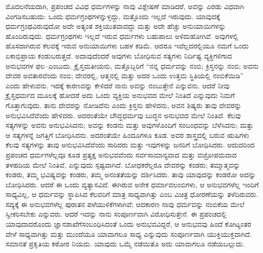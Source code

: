 ಮೊದಲನೆಯದಾಗಿ, ಪ್ರಪಂಚದ ವಿವಿಧ ಧರ್ಮಗಳನ್ನು ನಾವು ವಿಶ್ಲೇಷಣೆ ಮಾಡಿದರೆ, ಅವನ್ನು ಎರಡು ವಿಧವಾಗಿ ವಿಂಗಡಿಸಬಹುದು: ಒಂದು ಧರ್ಮಗ್ರಂಥಗಳನ್ನುಳ್ಳದ್ದು, ಮತ್ತೊಂದು ಇಲ್ಲದೆ ಇರುವುದು. ಯಾವುದಕ್ಕೆ ಧರ್ಮಗ್ರಂಥವಿರುವುದೋ ಅದೇ ಅತ್ಯಂತ ಶಕ್ತಿಯುತವಾದದ್ದು ಮತ್ತು ಅದೇ ಹೆಚ್ಚು ಅನುಯಾಯಿಗಳನ್ನು ಹೊಂದಿರುವುದು. ಧರ್ಮಗ್ರಂಥಗಳು ಇಲ್ಲದೆ ಇರುವ ಧರ್ಮಗಳು ಬಹುಪಾಲು ಅಳಿದುಹೋಗಿವೆ. ಅವುಗಳಲ್ಲಿ ಹೊಸದಾಗಿರುವ ಕೆಲವಕ್ಕೆ ಇರುವ ಅನುಯಾಯಿಗಳು ಬಹಳ ಕಡಿಮೆ. ಆದರೂ ಇವೆಲ್ಲದರಲ್ಲಿಯೂ ನಮಗೆ ಒಂದು ಏಕಾಭಿಪ್ರಾಯ ಕಂಡುಬರುತ್ತದೆ. ಅದಾವುದೆಂದರೆ ಅವುಗಳು ಬೋಧಿಸುವ ಸತ್ಯಗಳು ನಿರ್ದಿಷ್ಟ ವ್ಯಕ್ತಿಗಳಿಗಾದ ಅನುಭವಗಳ ಫಲ–ಎಂಬುದು. ಕ್ರೈಸ್ತಮತೀಯನು, ಮತ್ತೊಬ್ಬರಿಗೆ “ನನ್ನ ಧರ್ಮವನ್ನು ನಂಬಿ; ಕ್ರಿಸ್ತನನ್ನು ನಂಬಿ; ಅವನು ದೇವರ ಅವತಾರವೆಂದು ನಂಬಿ; ದೇವರಲ್ಲಿ, ಆತ್ಮನಲ್ಲಿ ಮತ್ತು ಅದರ ಒಂದು ಉತ್ತಮ ಸ್ಥಿತಿಯಲ್ಲಿ ನಂಬಿಕೆಯಿಡಿ” ಎಂದು ಹೇಳುವನು. ಇದಕ್ಕೆ ಕಾರಣವನ್ನು ಕೇಳಿದರೆ ನಾನು ಅವನ್ನು ನಂಬುತ್ತೇನೆ ಎನ್ನುವನು. ಆದರೆ ನೀವು ಕ್ರೈಸ್ತಧರ್ಮದ ಮೂಲಕ್ಕೆ ಹೋದರೆ ಅದು ಒಂದು ವ್ಯಕ್ತಿಯ ಅನುಭವದ ಮೇಲೆ ನಿಂತಿದೆ ಎನ್ನುವುದು ನಿಮಗೆ ಗೊತ್ತಾಗುವುದು. ತಾನು ದೇವರನ್ನು ನೋಡಿದೆನು ಎಂದು ಕ್ರಿಸ್ತನು ಹೇಳಿದನು, ಅವನ ಶಿಷ್ಯರು ತಾವು ದೇವರನ್ನು ಅನುಭವಿಸಿದೆವೆಂದು ಹೇಳಿದರು. ಅದರಂತೆಯೇ ಬೌದ್ಧಧರ್ಮವು ಬುದ್ಧನ ಅನುಭವದ ಮೇಲೆ ನಿಂತಿದೆ. ಕೆಲವು ಸತ್ಯಗಳನ್ನು ಅವನು ಅನುಭವಿಸಿದನು; ಅವನ್ನು ಕಂಡನು ಮತ್ತು ಅವುಗಳೊಂದಿಗೆ ಸಂಬಂಧವನ್ನು ಬೆಳೆಸಿದನು; ಮತ್ತು ಆ ಸತ್ಯಗಳನ್ನೆ ಜಗತ್ತಿಗೆ ಬೋಧಿಸಿದನು. ಅದರಂತೆಯೇ ಹಿಂದೂಗಳೂ ಕೂಡ. ಅವರ ಶಾಸ್ತ್ರದಲ್ಲಿ ಬರುವ ಋಷಿಗಳು ಕೆಲವು ಸತ್ಯಗಳನ್ನು ತಾವು ಅನುಭವಿಸಿದೆವೆಂದು ಸಾರಿದರು ಮತ್ತು ಇವುಗಳನ್ನು ಜನರಿಗೆ ಬೋಧಿಸಿದರು. ಆದುದರಿಂದ ಪ್ರಪಂಚದ ಧರ್ಮಗಳೆಲ್ಲವೂ ಕೂಡ ಪ್ರತ್ಯಕ್ಷ ಅನುಭವವೆಂದು ಸರ್ವಸಾಮಾನ್ಯವಾದ ಮತ್ತು ವಜ್ರೋಪಮವಾದ ತಳಹದಿಯ ಮೇಲೆ ನಿಂತಿವೆ, ಎನ್ನುವುದು ಸ್ಪಷ್ಟವಾಗಿದೆ. ಬೋಧಕರೆಲ್ಲರೂ ದೇವರನ್ನು ಕಂಡರು; ತಮ್ಮಾತ್ಮವನ್ನು ಕಂಡರು, ತಮ್ಮ ಭವಿಷ್ಯವನ್ನು ಕಂಡರು, ತಮ್ಮ ಅನಂತತೆಯನ್ನು ದರ್ಶಿಸಿದರು. ತಾವು ಯಾವುದನ್ನು ಕಂಡರೋ ಅದನ್ನು ಬೋಧಿಸಿದರು. ಆದರೆ ಈ ಒಂದು ವ್ಯತ್ಯಾಸವಿದೆ. ಈಗಿರುವ ಅನೇಕ ಧರ್ಮಾವಲಂಬಿಗಳು, ಆ ಅನುಭವಗಳೆಲ್ಲ ಇಂದಿಗೆ ಸಾಧ್ಯವಿಲ್ಲ, ಆ ಧರ್ಮವನ್ನು ಸ್ಥಾಪಿಸಿದ ಕೆಲವರಿಗೆ ಮಾತ್ರ ಸಾಧ್ಯವಾಗಿತ್ತು ಎಂಬ ವಿಚಿತ್ರ ಧೋರಣೆಯನ್ನು ತಳೆದಿರುವರು. ಸದ್ಯಕ್ಕೆ ಈ ಅನುಭವಗಳೆಲ್ಲ ಪುರಾತನ ಪಳೆಯುಳಿಕೆಗಳಾಗಿವೆ; ಆದಕಾರಣ ನಾವು ಧರ್ಮವನ್ನು ನಂಬಿಕೆಯ ಮೇಲೆ ಸ್ವೀಕರಿಸಬೇಕು ಎನ್ನುವರು. ಆದರೆ ಇದನ್ನು ನಾನು ಸಂಪೂರ್ಣ\break ವಾಗಿ ವಿರೋಧಿಸುತ್ತೇನೆ. ಈ ಪ್ರಪಂಚದಲ್ಲಿ ಯಾವುದಾದರೊಂದು ಜ್ಞಾನಶಾಖೆಗೆ\break ಸಂಬಂಧಿಸಿದಂತೆ ಒಂದು ಅನುಭವವಿದ್ದರೆ, ಆ ಅನುಭವವು ಹಿಂದೆ ಕೋಟ್ಯಂತರ ವೇಳೆ ಸಾಧ್ಯವಾಗಿತ್ತು ಮತ್ತು ಮುಂದೆಯೂ ಯಾವಾಗಲೂ ಸಾಧ್ಯ ಎನ್ನುವುದು ಸಂಪೂರ್ಣವಾಗಿ ಯುಕ್ತಿಯುಕ್ತವಾಗಿದೆ. ಸಮಾನತೆ ಪ್ರಕೃತಿಯ ಕಠೋರ ನಿಯಮ. ಯಾವುದು ಒಮ್ಮೆ ನಡೆಯಿತೊ ಅದು ಯಾವಾಗಲೂ ನಡೆಯಬಲ್ಲುದು. 

\vskip 5pt

